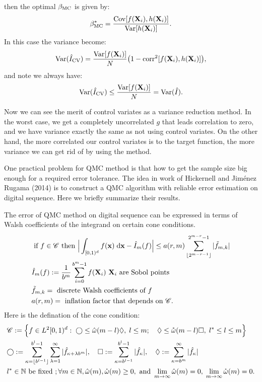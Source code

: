 then the optimal $\beta_{\mathrm{MC}}$ is given by: 
\begin{equation}
    \beta_{\mathrm{MC}}^*=\frac{\mathrm{Cov}[f(\mathbf{X}_i),h(\mathbf{X}_i)]}{\mathrm{Var}[h(\mathbf{X}_i)]}.
    \label{eq:optBeta}
\end{equation}
In this case the variance become:
\[
    \mathrm{Var}(\hat{I}_{\mathrm{CV}})= \frac{\mathrm{Var}[f(\mathbf{X}_i)]}{N}\big(1-\mathrm{corr}^2[f(\mathbf{X}_i), h(\mathbf{X}_i)]\big),
\]
and note we always have: 
\[
\mathrm{Var}(\hat{I}_{\mathrm{CV}}) \leq \frac{\mathrm{Var}[f(\mathbf{X}_i)]}{N}=\mathrm{Var}(\hat{I}).
\]

Now we can see the merit of control variates as a variance reduction method. 
In the worst case, we get a completely uncorrelated $g$ that leads correlation to zero, and we have variance exactly the same as not using control variates. On the other hand, the more correlated our control variates is to the target function, the more variance we can get rid of by using the method.


One practical problem for QMC method is that how to get the sample size big enough for a required error tolerance. The idea in work of Hickernell and Jim{\'e}nez Rugama (2014)\cite{hickernell2014reliable} is to construct a QMC algorithm with reliable error estimation on digital sequence. Here we briefly summarize their results.

The error of QMC method on digital sequence can be expressed in terms of Walsh coefficients of the integrand on certain cone conditions. 
\begin{align}
    \label{eq:errBound}
    &\text{ if } f \in \mathscr{C}\text{ then } \Big|\int_{[0,1)^d}f(\mathbf{x})\;\textrm{d}\mathbf{x} - \hat{I}_m(f)\Big| \leq a(r,m) \sum_{\lfloor 2^{m-r-1} \rfloor}^{2^{m-r}-1} |\tilde{f}_{m,k}|\\
    &\hat{I}_m(f): = \frac{1}{b^m}\sum_{i=0}^{b^m-1}f(\mathbf{X}_i)
    \text{ $\mathbf{X}_i$ are Sobol points}\notag\\
    &\tilde{f}_{m,k}=\text{ discrete Walsh coefficients of }f \notag\\
    &a(r,m) =\text{ inflation factor that depends on } \mathscr{C} \notag.
\end{align}
Here is the defination of the cone condition:
\begin{align}
   &\mathscr{C}:=\Big\{f\in L^2[0,1)^d:\;\bigcirc \leq \hat{\omega}(m-l)\Diamond,\; l\leq m;\quad
   \Diamond \leq \mathring{\omega}(m-l) \Box, 
   \; l^*\leq l \leq m\Big\}\notag\\
   \label{eq:cone}
   &\bigcirc:= \sum_{\kappa=\lfloor b^{l-1} \rfloor}^{b^l-1} \sum_{\lambda=1}^{\infty}| \hat{f}_{\kappa+\lambda b^m}|,\quad  
   \Box:= \sum_{\kappa=b^{l-1}}^{b^l-1}|\hat{f}_\kappa|,\quad
   \Diamond:=\sum_{\kappa=b^m}^{\infty}|\hat{f}_{\kappa}|\\
   &l^*\in \mathbb{N}\text{ be fixed }; \forall m\in \mathbb{N},\hat{\omega}(m),\mathring{\omega}(m)\geq 0, \text{ and } \lim_{m\to \infty} \hat{\omega}(m)=0,\; \lim_{m\to \infty} \mathring{\omega}(m)=0\notag.
\end{align}

